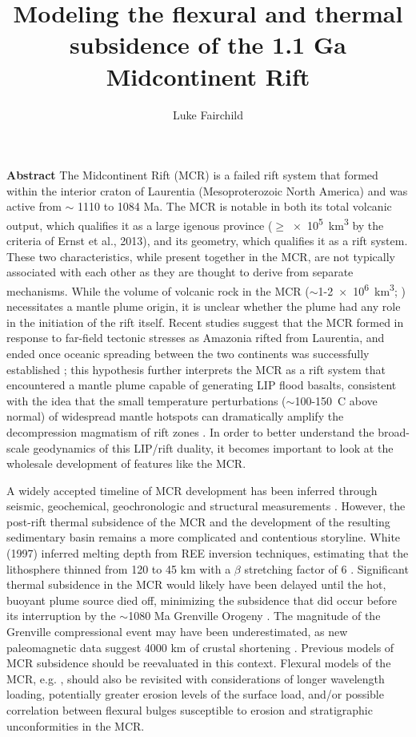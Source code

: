 \documentclass[11pt,a4paper]{article}
\title{Modeling the flexural and thermal subsidence of the 1.1 Ga Midcontinent Rift}
\author{Luke Fairchild}
\begin{document}
\maketitle{}
\textbf{Abstract}
The Midcontinent Rift (MCR) is a failed rift system that formed within the interior craton of Laurentia (Mesoproterozoic North America) and was active from $\sim$ 1110 to 1084 Ma. The MCR is notable in both its total volcanic output, which qualifies it as a large igenous province ($\geq$\SI{e5}{km^3} by the criteria of Ernst et al., 2013\nocite{Ernst2013b}), and its geometry, which qualifies it as a rift system. These two characteristics, while present together in the MCR, are not typically associated with each other as they are thought to derive from separate mechanisms. While the volume of volcanic rock in the MCR ($\sim$1-\SI{2e6}{km^3}; \cite{Hutchinson1990a}) necessitates a mantle plume origin, it is unclear whether the plume had any role in the initiation of the rift itself. Recent studies suggest that the MCR formed in response to far-field tectonic stresses as Amazonia rifted from Laurentia, and ended once oceanic spreading between the two continents was successfully established \cite{Stein2014a}; this hypothesis further interprets the MCR as a rift system that encountered a mantle plume capable of generating LIP flood basalts, consistent with the idea that the small temperature perturbations ($\sim$100-150\textdegree\ C above normal) of widespread mantle hotspots can dramatically amplify the decompression magmatism of rift zones \cite{White1989a}. In order to better understand the broad-scale geodynamics of this LIP/rift duality, it becomes important to look at the wholesale development of features like the MCR.\par{}
A widely accepted timeline of MCR development has been inferred through seismic, geochemical, geochronologic and structural measurements \cite{Cannon1989a,Cannon1992b,White1997a,Stein2015a}. However, the post-rift thermal subsidence of the MCR and the development of the resulting sedimentary basin remains a more complicated and contentious storyline. White (1997)\nocite{White1997a} inferred melting depth from REE inversion techniques, estimating that the lithosphere thinned from 120 to 45 km with a $\beta$ stretching factor of 6 \cite{McKenzie1978a}. Significant thermal subsidence in the MCR would likely have been delayed until the hot, buoyant plume source died off, minimizing the subsidence that did occur before its interruption by the $\sim$1080 Ma Grenville Orogeny \cite{White1997a}. The magnitude of the Grenville compressional event may have been underestimated, as new paleomagnetic data suggest 4000 km of crustal shortening \cite{Halls2015a}. Previous models of MCR subsidence should be reevaluated in this context. Flexural models of the MCR, e.g. \cite{Nyquist1988a}, should also be revisited with considerations of longer wavelength loading, potentially greater erosion levels of the surface load, and/or possible correlation between flexural bulges susceptible to erosion and stratigraphic unconformities in the MCR.\par{}
\end{document}
